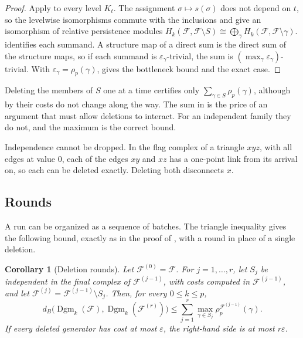 \documentclass[11pt,letterpaper]{article}
\newtheorem{corollary}[theorem]{Corollary}
\theoremstyle{definition}
\newcommand{\Dgm}{\operatorname{Dgm}}
\newcommand{\eps}{\varepsilon}
\begin{document}
\begin{proof}
Apply  to every level $K_t$. The assignment
$\sigma\mapsto s(\sigma)$ does not depend on $t$, so the levelwise
isomorphisms commute with the inclusions and give an isomorphism of relative
persistence modules
$H_k(\mathcal F,\mathcal F\setminus S)\cong
\bigoplus_{\gamma}H_k(\mathcal F,\mathcal F\setminus\gamma)$.
 identifies each summand. A structure map of a
direct sum is the direct sum of the structure maps, so if each summand is
$\eps_\gamma$-trivial, the sum is $(\max_\gamma\eps_\gamma)$-trivial. With
$\eps_\gamma=\rho_p(\gamma)$,  gives the
bottleneck bound and  the exact case.
\end{proof}

Deleting the members of $S$ one at a time certifies only
$\sum_{\gamma\in S}\rho_p(\gamma)$, although by  their
costs do not change along the way. The sum in 
is the price of an argument that must allow deletions to interact. For an
independent family they do not, and the maximum is the correct bound.

Independence cannot be dropped. In the flag complex of a triangle $xyz$, with
all edges at value $0$, each of the edges $xy$ and $xz$ has a one-point link
from its arrival on, so each can be deleted exactly. Deleting both disconnects
$x$.

\subsection{Rounds}

A run can be organized as a sequence of batches. The triangle inequality
gives the following bound, exactly as in the proof of
, with a round in place of a single deletion.

\begin{corollary}[Deletion rounds]
\label{cor:rounds}
Let $\mathcal F^{(0)}=\mathcal F$. For $j=1,\ldots,r$, let $S_j$ be
independent in the final complex of $\mathcal F^{(j-1)}$, with costs computed
in $\mathcal F^{(j-1)}$, and let $\mathcal F^{(j)}=\mathcal F^{(j-1)}\setminus
S_j$. Then, for every $0\leq k\leq p$,
$$
d_B\bigl(\Dgm_k(\mathcal F),\Dgm_k(\mathcal F^{(r)})\bigr)
\leq\sum_{j=1}^r\max_{\gamma\in S_j}\rho_p^{\mathcal F^{(j-1)}}(\gamma).
$$
If every deleted generator has cost at most $\eps$, the right-hand side is
at most $r\eps$.
\end{corollary}
\end{document}
